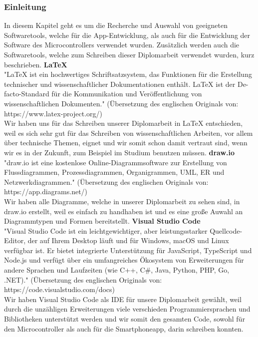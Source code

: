 \documentclass[11pt, twoside]{article}
\begin{document}
\subsubsection{Einleitung}
In diesem Kapitel geht es um die Recherche und Auswahl von geeigneten Softwaretools, welche für die App-Entwicklung, als auch für die Entwicklung der Software des Microcontrollers verwendet wurden. Zusätzlich werden auch die Softwaretools, welche zum Schreiben dieser Diplomarbeit verwendet wurden, kurz beschrieben. 
\vspace{4mm}\newline
\textbf{LaTeX} \\
"LaTeX ist ein hochwertiges Schriftsatzsystem, das Funktionen für die Erstellung technischer und wissenschaftlicher Dokumentationen enthält. LaTeX ist der De-facto-Standard für die Kommunikation und Veröffentlichung von wissenschaftlichen Dokumenten." (Übersetzung des englischen Originals von: https://www.latex-project.org/) \\
Wir haben uns für das Schreiben unserer Diplomarbeit in LaTeX entschieden, weil es sich sehr gut für das Schreiben von wissenschaftlichen Arbeiten, vor allem über technische Themen, eignet und wir somit schon damit vertraut sind, wenn wir es in der Zukunft, zum Beispiel im Studium benutzen müssen.
\vspace{4mm}\newline
\textbf{draw.io}
"draw.io ist eine kostenlose Online-Diagrammsoftware zur Erstellung von Flussdiagrammen, Prozessdiagrammen, Organigrammen, UML, ER und Netzwerkdiagrammen." (Übersetzung des englischen Originals von: https://app.diagrams.net/) \\
Wir haben alle Diagramme, welche in unserer Diplomarbeit zu sehen sind, in draw.io erstellt, weil es einfach zu handhaben ist und es eine große Auwahl an Diagrammtypen und Formen bereitstellt.
\vspace{4mm}\newline
\textbf{Visual Studio Code} \\
"Visual Studio Code ist ein leichtgewichtiger, aber leistungsstarker Quellcode-Editor, der auf Ihrem Desktop läuft und für Windows, macOS und Linux verfügbar ist. Er bietet integrierte Unterstützung für JavaScript, TypeScript und Node.js und verfügt über ein umfangreiches Ökosystem von Erweiterungen für andere Sprachen und Laufzeiten (wie C++, C\#, Java, Python, PHP, Go, .NET)." (Übersetzung des englischen Originals von: https://code.visualstudio.com/docs) \\
Wir haben Visual Studio Code als IDE für unsere Diplomarbeit gewählt, weil durch die unzähligen Erweiterungen viele verschieden Programmiersprachen und Bibliotheken unterstützt werden und wir somit den gesamten Code, sowohl für den Microcontroller als auch für die Smartphoneapp, darin schreiben konnten.
\end{document}
